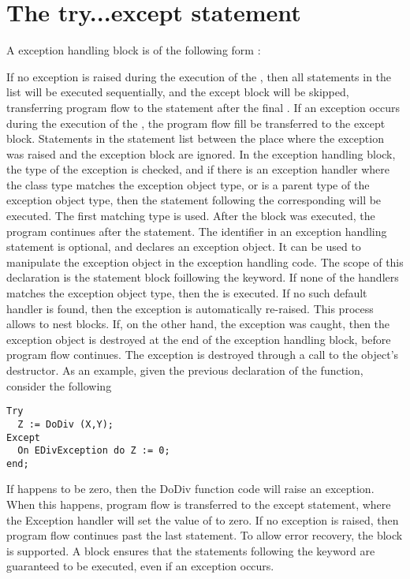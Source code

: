 \documentclass{report}
\begin{document}
\section{The try...except statement}
A  exception handling block is of the following form :

If no exception is raised during the execution of the ,
then all statements in the list will be executed sequentially, and the
except block will be skipped, transferring program flow to the statement
after the final .
If an exception occurs during the execution of the , the
program flow fill be transferred to the except block. Statements in the
statement list between the place where the exception was raised and the
exception block are ignored.
In the exception handling block, the type of the exception is checked,
and if there is an exception handler where the class type matches the
exception object type, or is a parent type of
the exception object type, then the statement following the corresponding
 will be executed. The first matching type is used. After the
 block was executed, the program continues after the 
statement.
The identifier in an exception handling statement is optional, and declares
an exception object. It can be used to manipulate the exception object in
the exception handling code. The scope of this declaration is the statement
block foillowing the  keyword.
If none of the  handlers matches the exception object type, then the
 is executed. If no such default handler is
found, then the exception is automatically re-raised. This process allows
to nest  blocks.
If, on the other hand, the exception was caught, then the exception object is
destroyed at the end of the exception handling block, before program flow
continues. The exception is destroyed through a call to the object's
 destructor.
As an example, given the previous declaration of the  function,
consider the following
\begin{verbatim}
Try
  Z := DoDiv (X,Y);
Except
  On EDivException do Z := 0;
end;
\end{verbatim}
If  happens to be zero, then the DoDiv function code will raise an
exception. When this happens, program flow is transferred to the except
statement, where the Exception handler will set the value of  to
zero. If no exception is raised, then program flow continues past the last
 statement.
To allow error recovery, the  block is supported.
A  block ensures that the statements following the
 keyword are guaranteed to be executed, even if an exception
occurs.
\end{document}
